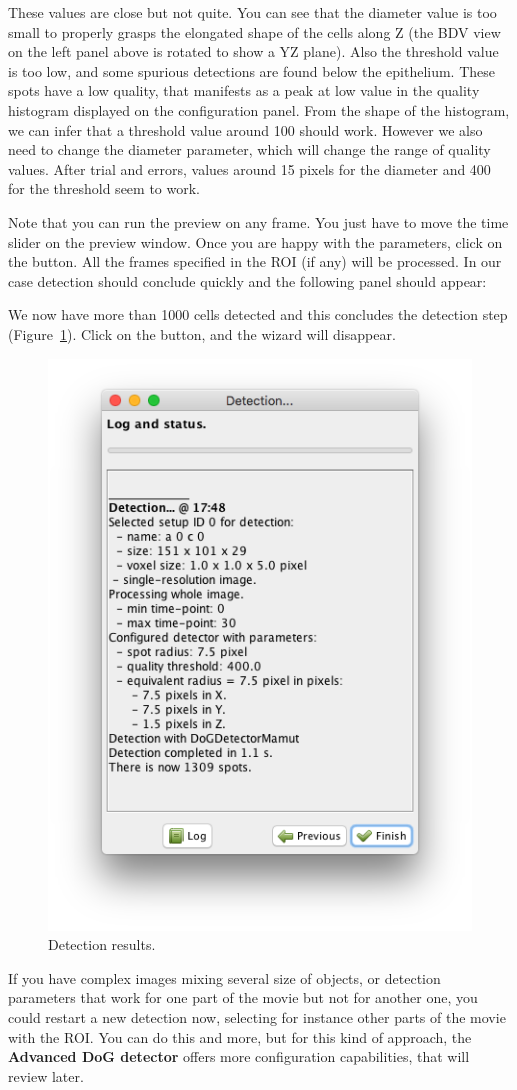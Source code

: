 These values are close but not quite.
You can see that the diameter value is too small to properly grasps the elongated shape of the cells along Z (the BDV view on the left panel above is rotated to show a YZ plane). 
Also the threshold value is too low, and some spurious detections are found below the epithelium.
These spots have a low quality, that manifests as a peak at low value in the quality histogram displayed on the configuration panel.
From the shape of the histogram, we can infer that a threshold value around 100 should work.
However we also need to change the diameter parameter, which will change the range of quality values.
After trial and errors, values around 15 pixels for the diameter and 400 for the threshold seem to work.

Note that you can run the preview on any frame.
You just have to move the time slider on the preview window.
Once you are happy with the parameters, click on the  button.
All the frames specified in the ROI (if any) will be processed. 
In our case detection should conclude quickly and the following panel should appear:

We now have more than 1000 cells detected and this concludes the detection step (Figure~\ref{fig:DetectionResults}).
Click on the  button, and the wizard will disappear.

\begin{figure}
    \label{fig:DetectionResults}
    \centering
    \includegraphics[height=0.40\textwidth, trim=0.5cm 0.5cm .5cm .5cm, clip]{figures/Mastodon_DetectionResuts.png}
    \caption{Detection results.}
\end{figure}

If you have complex images mixing several size of objects, or detection parameters that work for one part of the movie but not for another one, you could restart a new detection now, selecting for instance other parts of the movie with the ROI.
You can do this and more, but for this kind of approach, the \textbf{Advanced DoG detector} offers more configuration capabilities, that will review later.



